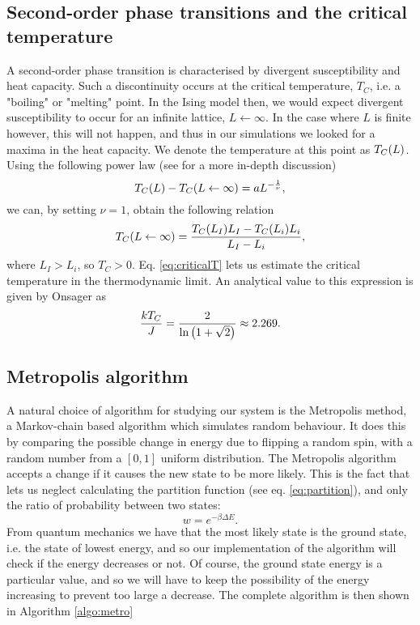 \subsection{Second-order phase transitions and the critical temperature}
\label{sec:phase}
A second-order phase transition is characterised by divergent susceptibility and heat capacity. Such a discontinuity occurs at the critical temperature, $T_C$, i.e. a "boiling" or "melting" point. In the Ising model then, we would expect divergent susceptibility to occur for an infinite lattice, $L \leftarrow \infty$. In the case where $L$ is finite however, this will not happen, and thus in our simulations we looked for a maxima in the heat capacity. We denote the temperature at this point as $T_C\qty(L)$. Using the following power law (see \cite{statmech} for a more in-depth discussion)
	\begin{equation}
	\label{eq:power}
	T_C\qty(L) - T_C\qty(L \leftarrow \infty) = aL^{-\frac{1}{\nu}},
	\end{equation}
we can, by setting $\nu = 1$, obtain the following relation
	\begin{equation}
	\label{eq:criticalT}
	T_C\qty(L \leftarrow \infty) = \frac{T_C\qty(L_I)L_I - T_C\qty(L_i)L_i}{L_I - L_i},
	\end{equation}
where $L_I > L_i$, so $T_C > 0$. Eq. \ref{eq:criticalT} lets us estimate the critical temperature in the thermodynamic limit. An analytical value to this expression is given by Onsager \cite{onsager} as
	\begin{equation}
	\label{eq:analyticT}
	\frac{kT_C}{J} = \frac{2}{\ln\qty(1 + \sqrt{2})} \approx 2.269.
	\end{equation}

\subsection{Metropolis algorithm}
\label{sec:metropolis}
A natural choice of algorithm for studying our system is the Metropolis method, a Markov-chain based algorithm which simulates random behaviour. It does this by comparing the possible change in energy due to flipping a random spin, with a random number from a $[0, 1]$ uniform distribution. The Metropolis algorithm accepts a change if it causes the new state to be more likely. This is the fact that lets us neglect calculating the partition function (see eq. \ref{eq:partition}), and only the ratio of probability between two states:
	\begin{equation}
	\label{eq:probratio}
		w = e^{-\beta \Delta E}.
	\end{equation}
From quantum mechanics we have that the most likely state is the ground state, i.e. the state of lowest energy, and so our implementation of the algorithm will check if the energy decreases or not. Of course, the ground state energy is a particular value, and so we will have to keep the possibility of the energy increasing to prevent too large a decrease. The complete algorithm is then shown in Algorithm \ref{algo:metro}
	
